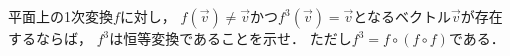 \documentclass[../../main.tex]{subfiles}
\begin{document}
平面上の1次変換$f$に対し，
$f(\vec{v})\neq\vec{v}$かつ$f^3(\vec{v})=\vec{v}$となるベクトル$\vec{v}$が存在するならば，
$f^3$は恒等変換であることを示せ．
ただし$f^3=f\circ(f \circ f)$である．
\end{document}
